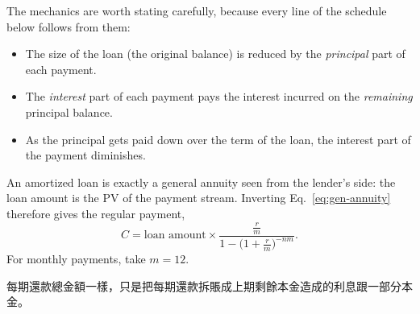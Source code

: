 The mechanics are worth stating carefully, because every line of the schedule below follows from them:

\begin{itemize}[nosep]
	\item The size of the loan (the original balance) is reduced by the \emph{principal} part of each payment.
	\item The \emph{interest} part of each payment pays the interest incurred on the \emph{remaining} principal balance.
	\item As the principal gets paid down over the term of the loan, the interest part of the payment diminishes.
\end{itemize}

An amortized loan is exactly a general annuity seen from the lender's side: the loan amount is the PV of the payment stream.
Inverting Eq.~\eqref{eq:gen-annuity} therefore gives the regular payment,
\begin{equation}
	C = \text{loan amount} \times
	\frac{\frac{r}{m}}{1-\bigl(1+\frac{r}{m}\bigr)^{-nm}} .
	\label{eq:amort-payment}
\end{equation}
For monthly payments, take $m = 12$.

\suppstart
\begin{remark}
    每期還款總金額一樣，只是把每期還款拆賬成上期剩餘本金造成的利息跟一部分本金。
\end{remark}

